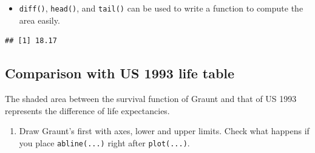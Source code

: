 \documentclass[
]{article}
\newenvironment{Shaded}{\begin{snugshade}}{\end{snugshade}}
\newcommand{\ControlFlowTok}[1]{\textcolor[rgb]{0.13,0.29,0.53}{\textbf{#1}}}
\newcommand{\DecValTok}[1]{\textcolor[rgb]{0.00,0.00,0.81}{#1}}
\newcommand{\FunctionTok}[1]{\textcolor[rgb]{0.00,0.00,0.00}{#1}}
\newcommand{\NormalTok}[1]{#1}
\newcommand{\OtherTok}[1]{\textcolor[rgb]{0.56,0.35,0.01}{#1}}
\newcommand{\SpecialCharTok}[1]{\textcolor[rgb]{0.00,0.00,0.00}{#1}}
\providecommand{\tightlist}{%
  \setlength{\itemsep}{0pt}\setlength{\parskip}{0pt}}
\begin{document}
\begin{itemize}
\tightlist
\item
  \texttt{diff()}, \texttt{head()}, and \texttt{tail()} can be used to
  write a function to compute the area easily.
\end{itemize}

\begin{Shaded}
\end{Shaded}

\begin{verbatim}
## [1] 18.17
\end{verbatim}

\hypertarget{comparison-with-us-1993-life-table}{%
\subsection{Comparison with US 1993 life
table}\label{comparison-with-us-1993-life-table}}

The shaded area between the survival function of Graunt and that of US
1993 represents the difference of life expectancies.

\begin{enumerate}
\def\labelenumi{\arabic{enumi}.}
\tightlist
\item
  Draw Graunt's first with axes, lower and upper limits. Check what
  happens if you place \texttt{abline(...)} right after
  \texttt{plot(...)}.
\end{enumerate}
\end{document}
